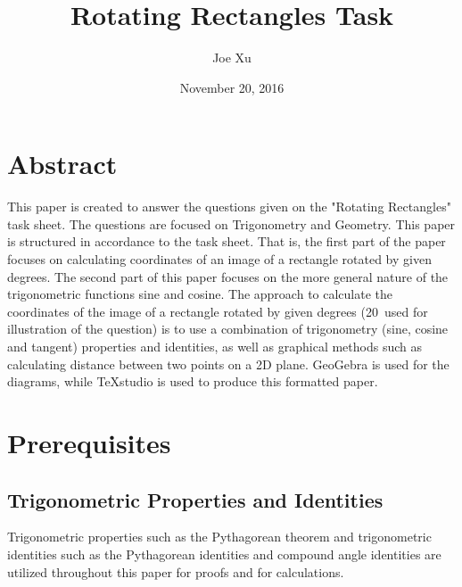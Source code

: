 \documentclass{article}
\title  {Rotating Rectangles Task}
\date   {November 20, 2016}
\author {Joe Xu}
\begin{document}
    \maketitle
    \newpage
    
    \section*{Abstract}
        This paper is created to answer the questions given on the "Rotating Rectangles" task sheet. The questions are focused on  Trigonometry and Geometry.
        \newline\newline
        This paper is structured in accordance to the task sheet. That is, the first part of the paper focuses on calculating coordinates of an image of a rectangle rotated by given degrees. The second part of this paper focuses on the more general nature of the trigonometric functions sine and cosine.
        \newline\newline
        The approach to calculate the coordinates of the image of a rectangle rotated by given degrees (20\degree \ used for illustration of the question) is to use a combination of trigonometry (sine, cosine and tangent) properties and identities, as well as graphical methods such as calculating distance between two points on a 2D plane.
        \newline\newline
        GeoGebra\autocite{GEOGEBRA:1} is used for the diagrams, while TeXstudio\autocite{TEXSTUDIO:1} is used to produce this formatted paper.
    \newpage
    
    \tableofcontents
    \newpage
    
        
    \section{Prerequisites}
        \subsection{Trigonometric Properties and Identities}
        Trigonometric properties such as the Pythagorean theorem and trigonometric identities such as the Pythagorean identities and compound angle identities are utilized throughout this paper for proofs and for calculations.
\end{document}
